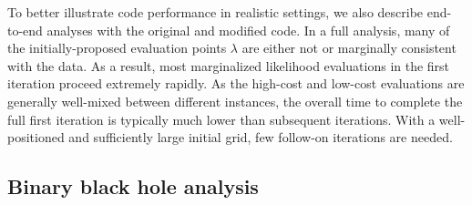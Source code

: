 \documentclass[twocolumn,prd,nofootinbib]{revtex4}
\begin{document}
To better illustrate code performance in realistic settings, we also describe end-to-end analyses with
the original and modified code.     In a full analysis, many of the initially-proposed  evaluation points $\lambda$ are
either not or marginally consistent with the data.  As a result, most marginalized likelihood evaluations in the first
iteration proceed extremely rapidly.  As the high-cost and low-cost evaluations are generally well-mixed between
different instances, the overall time to complete the full first iteration is typically much lower than subsequent
iterations.   With a well-positioned and sufficiently large initial grid,  few follow-on iterations are needed.  




\subsection{Binary black hole analysis}
\label{sec:sub:BBHFull}
\end{document}
